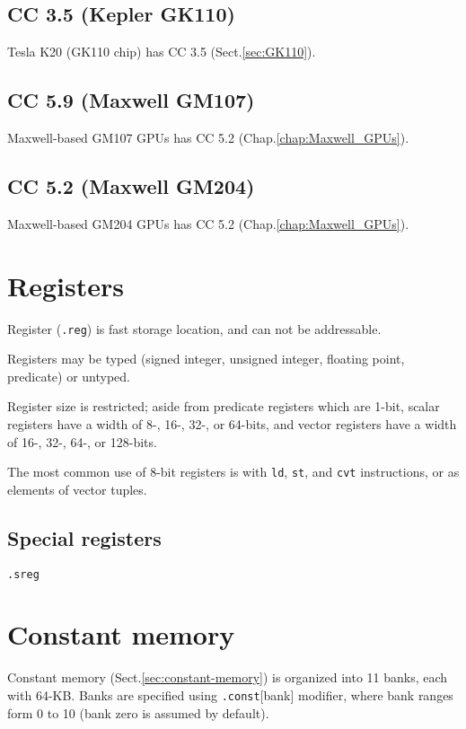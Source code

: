 \subsection{CC 3.5 (Kepler GK110)}
\label{sec:CC3.5}

Tesla K20 (GK110 chip) has CC 3.5 (Sect.\ref{sec:GK110}).


\subsection{CC 5.9 (Maxwell GM107)}
\label{sec:CC5.0}

Maxwell-based GM107 GPUs has CC 5.2 (Chap.\ref{chap:Maxwell_GPUs}). 

\subsection{CC 5.2 (Maxwell GM204)}
\label{sec:CC5.2}

Maxwell-based GM204 GPUs has CC 5.2 (Chap.\ref{chap:Maxwell_GPUs}). 

\section{Registers}
\label{sec:registers-ptx}

Register (\verb!.reg!) is fast storage location, and can not be
addressable. 

Registers may be typed (signed integer, unsigned integer, floating
point, predicate) or untyped. 

Register size is restricted; aside from predicate registers which are
1-bit, scalar registers have a width of 8-, 16-, 32-, or 64-bits, and
vector registers have a width of 16-, 32-, 64-, or 128-bits. 

The most common use of 8-bit registers is with \verb!ld!, \verb!st!,
and \verb!cvt! instructions, or as elements of vector tuples.

\subsection{Special registers}
\label{sec:special-registers}

\verb!.sreg!

\section{Constant memory}
\label{sec:ptx_constantmemory}

Constant memory (Sect.\ref{sec:constant-memory}) is organized into 11 banks,
each with 64-KB.
Banks are specified using \verb!.const![bank] modifier, where bank ranges form 0
to 10 (bank zero is assumed by default). 

